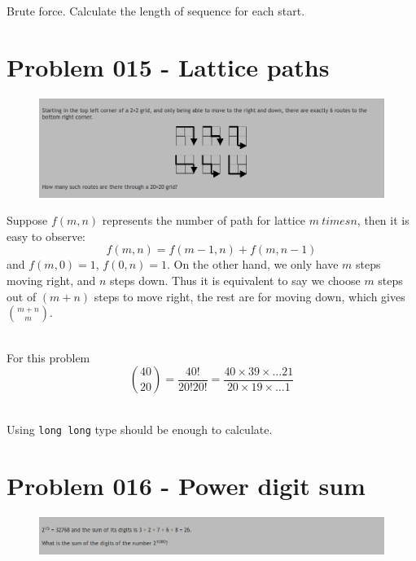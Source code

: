 \begin{sol}
Brute force. Calculate the length of sequence for each start.
\end{sol}
\newpage
\section{Problem 015 - Lattice paths}
\begin{prob}
	\begin{figure}[htb!]
		\begin{center}
			\includegraphics[scale = 0.4]{pic/015.png}
		\end{center}
	\end{figure}
\end{prob}

\begin{sol}
Suppose $f(m,n)$ represents the number of path for lattice $m \ times n$, then it is easy to observe:
$$f(m, n) = f(m - 1, n) + f(m, n - 1)$$
and $f(m, 0) = 1$, $f(0, n) = 1$. 
On the other hand, we only have $m$ steps moving right, and $n$ steps down. Thus it is equivalent to say we choose $m$ steps out of $(m + n)$ steps to move right, the rest are for moving down, which gives ${m + n}\choose m $.

\noindent \\For this problem 
$${40 \choose 20} = \frac{40!}{20! 20!} = \frac{40 \times 39 \times\dots 21}{20 \times 19\times \dots 1}$$

\noindent \\Using \texttt{long long} type should be enough to calculate.
\end{sol}
\section{Problem 016 - Power digit sum}
\begin{prob}
\begin{figure}[htb!]
	\begin{center}
	\includegraphics[scale = 0.4]{pic/016.png}
	\end{center}
\end{figure}
\end{prob}

